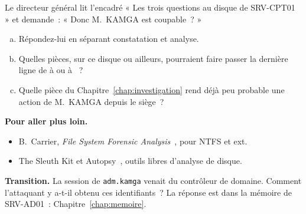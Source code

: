 \begin{boxexo}[title={\ding{45}\quad Exercice~4.4. Du compte à la personne \niveauexpert}]
Le directeur général lit l'encadré « Les trois questions au disque de
SRV-CPT01 » et demande~: « Donc
M.~KAMGA est coupable~? »
\begin{enumerate}[(a)]
    \item Répondez-lui en séparant constatation et analyse.
    \item Quelles pièces, sur ce disque ou ailleurs, pourraient faire passer
          la dernière ligne de \NEK{} à \OUI{} ou à \NON{}~?
    \item Quelle pièce du Chapitre~\ref{chap:investigation} rend déjà peu
          probable une action de M.~KAMGA depuis le siège~?
\end{enumerate}
\end{boxexo}

\bigskip

\begin{boxinfo}
\textbf{Pour aller plus loin.}
\begin{itemize}
    \item B.~Carrier, \textit{File System Forensic
          Analysis}~\cite{carrier2005}, pour NTFS et ext.
    \item The Sleuth Kit et Autopsy~\cite{sleuthkit}, outils libres
          d'analyse de disque.
\end{itemize}
\end{boxinfo}

\begin{boxinfo}
\textbf{Transition.} La session de \texttt{adm.kamga} venait du contrôleur
de domaine. Comment l'attaquant y a-t-il obtenu ces identifiants~? La
réponse est dans la mémoire de SRV-AD01~: Chapitre~\ref{chap:memoire}.
\end{boxinfo}
